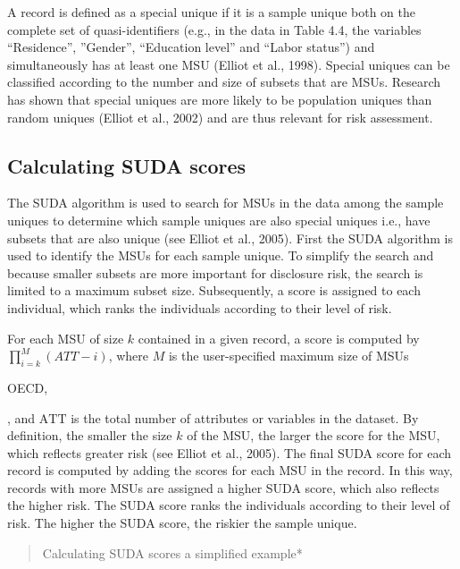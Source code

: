 \documentclass[letterpaper,10pt,english]{sphinxmanual}
\begin{document}
A record is defined as a special unique if it is a sample unique both on
the complete set of quasi-identifiers (e.g., in the data in Table 4.4,
the variables “Residence”, ”Gender”, “Education level” and “Labor
status”) and simultaneously has at least one MSU (Elliot et al., 1998).
Special uniques can be classified according to the number and size of
subsets that are MSUs. Research has shown that special uniques are more
likely to be population uniques than random uniques (Elliot et al.,
2002) and are thus relevant for risk assessment.


\subsection{Calculating SUDA scores}
\label{\detokenize{measure_risk:calculating-suda-scores}}
The SUDA algorithm is used to search for MSUs in the data among the
sample uniques to determine which sample uniques are also special
uniques i.e., have subsets that are also unique (see Elliot et al.,
2005). First the SUDA algorithm is used to identify the MSUs for each
sample unique. To simplify the search and because smaller subsets are
more important for disclosure risk, the search is limited to a maximum
subset size. Subsequently, a score is assigned to each individual, which
ranks the individuals according to their level of risk.

For each MSU of size \(k\) contained in a given record, a score is
computed by \(\prod_{i = k}^{M}{(ATT - i)}\), where \(M\) is the
user-specified maximum size of MSUs %
\begin{footnote}[12]\sphinxAtStartFootnote
OECD, 
%
\end{footnote}, and
\(\text{ATT}\) is the total number of attributes or variables in the
dataset. By definition, the smaller the size \(k\) of the MSU, the
larger the score for the MSU, which reflects greater risk (see Elliot et
al., 2005). The final SUDA score for each record is computed by adding
the scores for each MSU in the record. In this way, records with more
MSUs are assigned a higher SUDA score, which also reflects the higher
risk. The SUDA score ranks the individuals according to their level of
risk. The higher the SUDA score, the riskier the sample unique.
\begin{quote}

Calculating SUDA scores \textendash{} a simplified example*
\end{quote}
\end{document}
